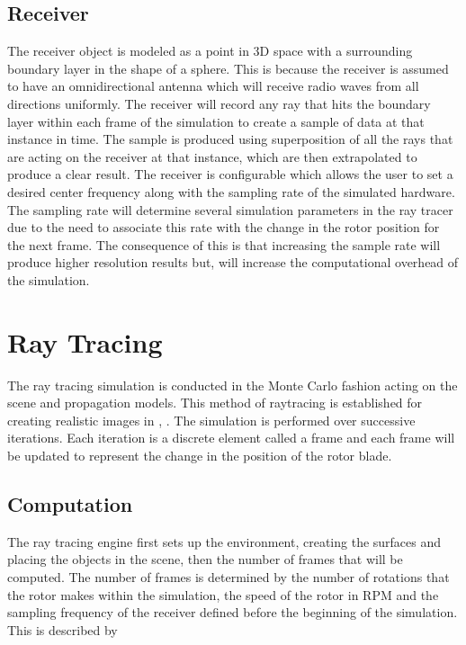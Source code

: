 \subsection{Receiver}
The receiver object is modeled as a point in 3D space with a surrounding boundary layer in the shape of a sphere. This is because the receiver is assumed to have an omnidirectional antenna which will receive radio waves from all directions uniformly. The receiver will record any ray that hits the boundary layer within each frame of the simulation to create a sample of data at that instance in time.
The sample is produced using superposition of all the rays that are acting on the receiver at that instance, which are then extrapolated to produce a clear result.
The receiver is configurable which allows the user to set a desired center frequency along with the sampling rate of the simulated hardware. The sampling rate will determine several simulation parameters in the ray tracer due to the need to associate this rate with the change in the rotor position for the next frame. The consequence of this is that increasing the sample rate will produce higher resolution results but, will increase the computational overhead of the simulation.

\section{Ray Tracing}
The ray tracing simulation is conducted in the Monte Carlo fashion acting on the scene and propagation models. This method of raytracing is established for creating realistic images in \cite{Suffern2007}, \cite{Pharr2010}. The simulation is performed over successive iterations. Each iteration is a discrete element called a frame and each frame will be updated to represent the change in the position of the rotor blade.

\subsection{Computation}
The ray tracing engine first sets up the environment, creating the surfaces and placing the objects in the scene, then the number of frames that will be computed. The number of frames is determined by the number of rotations that the rotor makes within the simulation, the speed of the rotor in RPM and the sampling frequency of the receiver defined before the beginning of the simulation. This is described by

